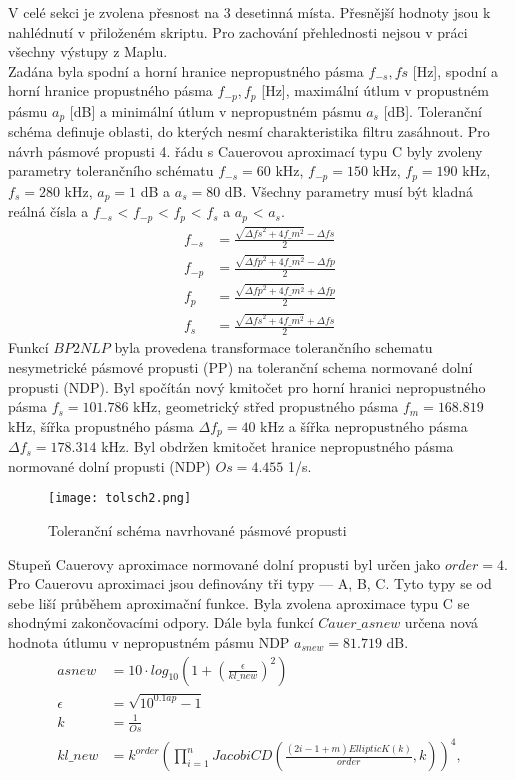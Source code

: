 V celé sekci je zvolena přesnost na 3 desetinná místa. Přesnější hodnoty jsou k nahlédnutí v přiloženém skriptu. Pro zachování přehlednosti nejsou v práci všechny výstupy z Maplu.\\
Zadána byla spodní a horní hranice nepropustného pásma $f_{-s},fs$ [Hz], spodní a horní hranice propustného pásma $f_{-p},f_p$ [Hz], maximální útlum v propustném pásmu $a_p$ [dB] a minimální útlum v nepropustném pásmu $a_s$ [dB]. Toleranční schéma definuje oblasti, do kterých nesmí charakteristika filtru zasáhnout. Pro návrh pásmové propusti 4. řádu s Cauerovou aproximací typu C byly zvoleny parametry tolerančního schématu $f_{-s} = 60$ kHz, $f_{-p} = 150$ kHz, $f_p = 190$ kHz, $f_s = 280$ kHz, $a_p = 1$ dB a $a_s = 80$ dB. Všechny parametry musí být kladná reálná čísla a $f_{-s}$ <  $f_{-p}$ < $f_p$ < $f_s$ a $a_p$ < $a_s$. 
\begin{align}
f_{-s} &= \frac{\sqrt{\Delta{fs}^2+4f\_m ^2}-\Delta{fs}}{2}\\
f_{-p} &= \frac{\sqrt{\Delta{fp}^2+4f\_m ^2}-\Delta{fp}}{2}\\
f_p &= \frac{\sqrt{\Delta{fp}^2+4f\_m ^2}+\Delta{fp}}{2}\\
f_s &= \frac{\sqrt{\Delta{fs}^2+4f\_m ^2}+\Delta{fs}}{2}
\end{align}
Funkcí $BP2NLP$ byla provedena transformace tolerančního schematu nesymetrické pásmové propusti (PP) na toleranční schema normované dolní propusti (NDP). Byl spočítán nový kmitočet pro horní hranici nepropustného pásma $f_s = 101.786$ kHz, geometrický střed propustného pásma $f_m = 168.819$ kHz, šířka propustného pásma $\Delta{f_p} = 40$ kHz a šířka nepropustného pásma $\Delta{f_s} = 178.314$ kHz. Byl obdržen kmitočet hranice nepropustného pásma normované dolní propusti (NDP) $Os = 4.455$ 1/s.
\begin{figure}[h]
\centering
\texttt{[image: tolsch2.png]}
\caption{Toleranční schéma navrhované pásmové propusti}
\end{figure}
\noindent Stupeň Cauerovy aproximace normované dolní propusti byl určen jako $order = 4$. Pro Cauerovu aproximaci jsou definovány tři typy --- A, B, C. Tyto typy se od sebe liší průběhem aproximační funkce. Byla zvolena aproximace typu C se shodnými zakončovacími odpory.
\noindent Dále byla funkcí $Cauer\_asnew$ určena nová hodnota útlumu v nepropustném pásmu NDP $a_{snew} = 81.719$ dB.
\begin{align}
asnew&= 10 \cdot log_{10}\left(1 + \left( \frac{\epsilon}{kl\_new}\right)^2\right)\\
\epsilon &= \sqrt{10^{0.1ap} - 1}\\
k &= \frac{1}{Os}\\
kl\_new &= k^{order}\left(\prod_{i=1}^{n}JacobiCD\left(\frac{(2i - 1 + m)EllipticK(k)}{order},k\right)\right)^4,
\end{align}
